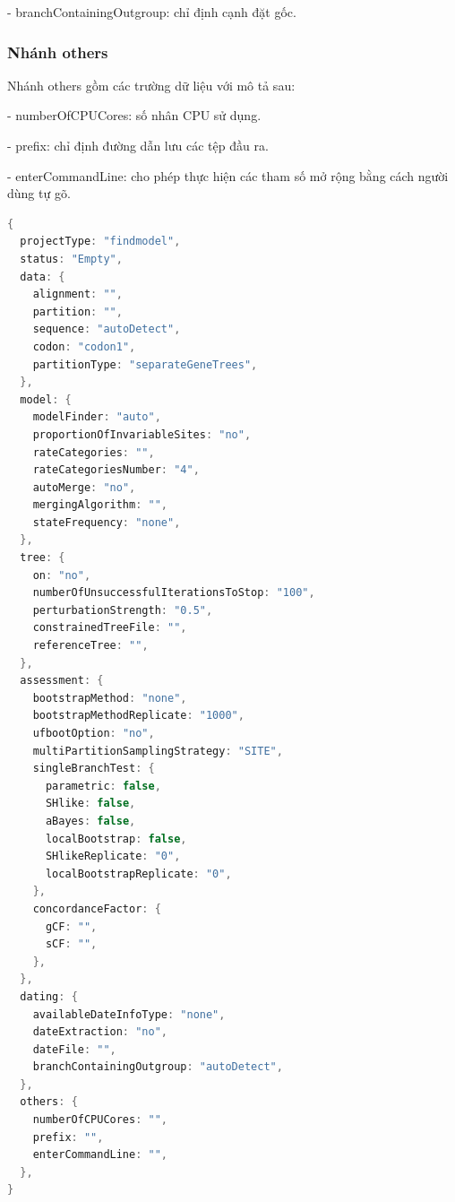 \documentclass[12pt]{report}
\begin{document}
    - branchContainingOutgroup: chỉ định cạnh đặt gốc.

\subsubsection{Nhánh others}
    Nhánh others gồm các trường dữ liệu với mô tả sau:
    
    - numberOfCPUCores: số nhân CPU sử dụng.
    
    - prefix: chỉ định đường dẫn lưu các tệp đầu ra.
    
    - enterCommandLine: cho phép thực hiện các tham số mở rộng bằng cách người dùng tự gõ.

\begin{lstlisting}[language=Java,
caption={Dữ liệu cài đặt mặc định phân cấp với dự án kiểu Find Model },label={code:jdt-ast-gen}]
{
  projectType: "findmodel",
  status: "Empty",
  data: {
    alignment: "",
    partition: "",
    sequence: "autoDetect",
    codon: "codon1",
    partitionType: "separateGeneTrees",
  },
  model: {
    modelFinder: "auto",
    proportionOfInvariableSites: "no",
    rateCategories: "",
    rateCategoriesNumber: "4",
    autoMerge: "no",
    mergingAlgorithm: "",
    stateFrequency: "none",
  },
  tree: {
    on: "no",
    numberOfUnsuccessfulIterationsToStop: "100",
    perturbationStrength: "0.5",
    constrainedTreeFile: "",
    referenceTree: "",
  },
  assessment: {
    bootstrapMethod: "none",
    bootstrapMethodReplicate: "1000",
    ufbootOption: "no",
    multiPartitionSamplingStrategy: "SITE",
    singleBranchTest: {
      parametric: false,
      SHlike: false,
      aBayes: false,
      localBootstrap: false,
      SHlikeReplicate: "0",
      localBootstrapReplicate: "0",
    },
    concordanceFactor: {
      gCF: "",
      sCF: "",
    },
  },
  dating: {
    availableDateInfoType: "none",
    dateExtraction: "no",
    dateFile: "",
    branchContainingOutgroup: "autoDetect",
  },
  others: {
    numberOfCPUCores: "",
    prefix: "",
    enterCommandLine: "",
  },
}
\end{lstlisting}
\end{document}

